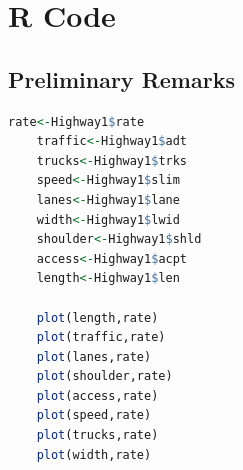 \documentclass[12pt]{report}
\begin{document}
\section{R Code}
\subsection{Preliminary Remarks}
\begin{lstlisting}[language=R]
    rate<-Highway1$rate
    traffic<-Highway1$adt
    trucks<-Highway1$trks
    speed<-Highway1$slim
    lanes<-Highway1$lane
    width<-Highway1$lwid
    shoulder<-Highway1$shld
    access<-Highway1$acpt
    length<-Highway1$len

    plot(length,rate)
    plot(traffic,rate)
    plot(lanes,rate)
    plot(shoulder,rate)
    plot(access,rate)
    plot(speed,rate)
    plot(trucks,rate)
    plot(width,rate)
\end{lstlisting}
\end{document}
